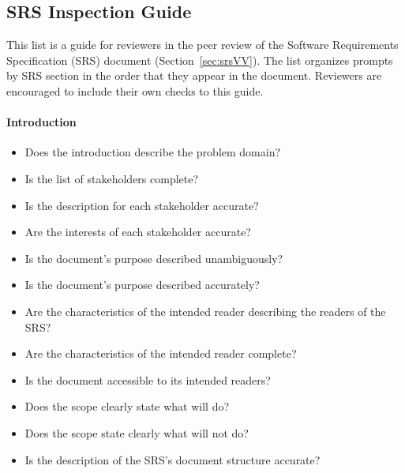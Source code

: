 \subsection{SRS Inspection Guide}\label{appendix:srsInspection}
This list is a guide for reviewers in the peer review of the Software
Requirements Specification (SRS) document (Section~\ref{sec:srsVV}). The list
organizes prompts by SRS section in the order that they appear in the document.
Reviewers are encouraged to include their own checks to this guide.

\paragraph{Introduction}
\begin{itemize}

    \item Does the introduction describe the problem domain?

    \item Is the list of stakeholders complete?

    \item Is the description for each stakeholder accurate?

    \item Are the interests of each stakeholder accurate?

    \item Is the document's purpose described unambiguously?

    \item Is the document's purpose described accurately?

    \item Are the characteristics of the intended reader describing the readers
    of the SRS?

    \item Are the characteristics of the intended reader complete?

    \item Is the document accessible to its intended readers?

    \item Does the scope clearly state what \progname{} will do?

    \item Does the scope state clearly what \progname{} will not do?

    \item Is the description of the SRS's document structure accurate?

\end{itemize}

